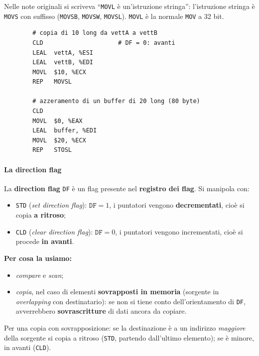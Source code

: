 \documentclass[11pt,a4paper]{article}
\begin{document}
\begin{nota}
Nelle note originali si scriveva ``\texttt{MOVL} è un'istruzione stringa'': l'istruzione stringa è \texttt{MOVS} con suffisso (\texttt{MOVSB}, \texttt{MOVSW}, \texttt{MOVSL}). \texttt{MOVL} è la normale \texttt{MOV} a 32 bit.
\end{nota}

\begin{integrazione}
\begin{lstlisting}
        # copia di 10 long da vettA a vettB
        CLD                     # DF = 0: avanti
        LEAL  vettA, %ESI
        LEAL  vettB, %EDI
        MOVL  $10, %ECX
        REP   MOVSL

        # azzeramento di un buffer di 20 long (80 byte)
        CLD
        MOVL  $0, %EAX
        LEAL  buffer, %EDI
        MOVL  $20, %ECX
        REP   STOSL
\end{lstlisting}
\end{integrazione}

\paragraph*{La direction flag}

La \textbf{direction flag} \texttt{DF} è un flag presente nel \textbf{registro dei flag}. Si manipola con:
\begin{itemize}[leftmargin=*]
  \item \texttt{STD} (\emph{set direction flag}): $\texttt{DF}=1$, i puntatori vengono \textbf{decrementati}, cioè si copia \textbf{a ritroso};
  \item \texttt{CLD} (\emph{clear direction flag}): $\texttt{DF}=0$, i puntatori vengono incrementati, cioè si procede \textbf{in avanti}.
\end{itemize}

\textbf{Per cosa la usiamo:}
\begin{itemize}[leftmargin=*]
  \item \emph{compare} e \emph{scan};
  \item \emph{copia}, nel caso di elementi \textbf{sovrapposti in memoria} (sorgente in \emph{overlapping} con destinatario): se non si tiene conto dell'orientamento di \texttt{DF}, avverrebbero \textbf{sovrascritture} di dati ancora da copiare.
\end{itemize}

\begin{integrazione}
Per una copia con sovrapposizione: se la destinazione è a un indirizzo \emph{maggiore} della sorgente si copia a ritroso (\texttt{STD}, partendo dall'ultimo elemento); se è minore, in avanti (\texttt{CLD}).
\end{integrazione}
\end{document}

